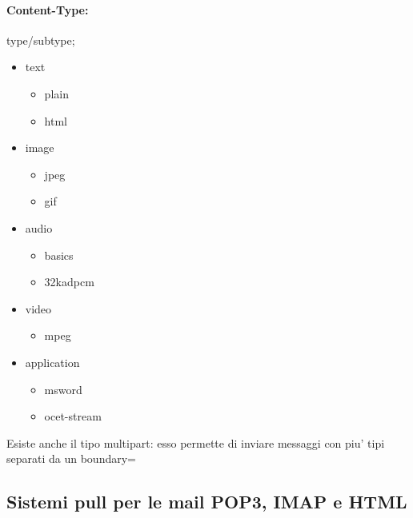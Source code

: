 \paragraph{Content-Type:}
type/subtype;
\begin{multicols}{2}
\begin{itemize}
    \item text
    \begin{itemize}
        \item plain
        \item html
    \end{itemize}
    \item image
    \begin{itemize}
        \item jpeg
        \item gif
    \end{itemize}
    \columnbreak
    \item audio
    \begin{itemize}
        \item basics
        \item 32kadpcm
    \end{itemize}
    \item video
    \begin{itemize}
        \item mpeg
    \end{itemize}
    \item application
    \begin{itemize}
        \item msword
        \item ocet-stream
    \end{itemize}
\end{itemize}
\end{multicols}

Esiste anche il tipo multipart: esso permette di inviare messaggi con piu' tipi separati da un {\color{blue}boundary=}

\subsection{Sistemi pull per le mail POP3, IMAP e HTML}
